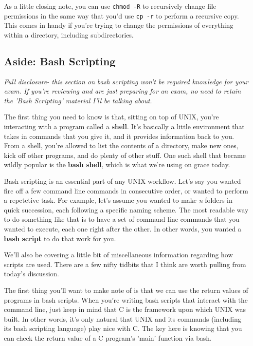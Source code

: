 \documentclass[english, 10pt]{article}
\begin{document}
As a little closing note, you can use \texttt{chmod -R} to recursively change file permissions in the same way that you'd use \texttt{cp -r} to perform a recursive copy. This comes in handy if you're trying to change the permissions of everything within a directory, including subdirectories.

\subsection{Aside: Bash Scripting}

\textit{Full disclosure- this section on bash scripting won't be required knowledge for your exam. If you're reviewing and are just preparing for an exam, no need to retain the 'Bash Scripting' material I'll be talking about.}\newline

The first thing you need to know is that, sitting on top of UNIX, you're interacting with a program called a \textbf{shell}. It's basically a little environment that takes in commands that you give it, and it provides information back to you. From a shell, you're allowed to list the contents of a directory, make new ones, kick off other programs, and do plenty of other stuff. One such shell that became wildly popular is the \textbf{bash shell}, which is what we're using on grace today.

Bash scripting is an essential part of any UNIX workflow. Let's say you wanted fire off a few command line commands in consecutive order, or wanted to perform a repetetive task. For example, let's assume you wanted to make \textit{n} folders in quick succession, each following a specific naming scheme. The most readable way to do something like that is to have a set of command line commands that you wanted to execute, each one right after the other. In other words, you wanted a \textbf{bash script} to do that work for you.\newline

We'll also be covering a little bit of miscellaneous information regarding how scripts are used. There are a few nifty tidbits that I think are worth pulling from today's discussion.\newline

The first thing you'll want to make note of is that we can use the return values of programs in bash scripts. When you're writing bash scripts that interact with the command line, just keep in mind that C is the framework upon which UNIX was built. In other words, it's only natural that UNIX and its commands (including its bash scripting language) play nice with C. The key here is knowing that you can check the return value of a C program's 'main' function via bash.\newline
\end{document}
